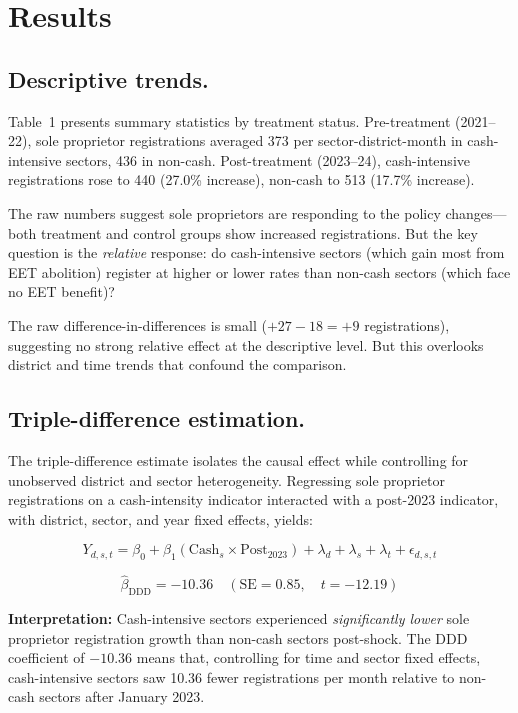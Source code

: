 \documentclass[12pt]{article}
\begin{document}
\section{Results}

\subsection*{Descriptive trends.}
Table~1 presents summary statistics by treatment status. Pre-treatment (2021--22), sole proprietor registrations averaged 373 per sector-district-month in cash-intensive sectors, 436 in non-cash. Post-treatment (2023--24), cash-intensive registrations rose to 440 (27.0\% increase), non-cash to 513 (17.7\% increase).

The raw numbers suggest sole proprietors are responding to the policy changes—both treatment and control groups show increased registrations. But the key question is the \emph{relative} response: do cash-intensive sectors (which gain most from EET abolition) register at higher or lower rates than non-cash sectors (which face no EET benefit)?

The raw difference-in-differences is small ($+27 - 18 = +9$ registrations), suggesting no strong relative effect at the descriptive level. But this overlooks district and time trends that confound the comparison.

\subsection*{Triple-difference estimation.}
The triple-difference estimate isolates the causal effect while controlling for unobserved district and sector heterogeneity. Regressing sole proprietor registrations on a cash-intensity indicator interacted with a post-2023 indicator, with district, sector, and year fixed effects, yields:

$$Y_{d,s,t} = \beta_0 + \beta_1 (\text{Cash}_s \times \text{Post}_{2023}) + \lambda_d + \lambda_s + \lambda_t + \epsilon_{d,s,t}$$

$$\hat{\beta}_{\text{DDD}} = -10.36 \quad (\text{SE} = 0.85, \quad t = -12.19)$$

\textbf{Interpretation:} Cash-intensive sectors experienced \emph{significantly lower} sole proprietor registration growth than non-cash sectors post-shock. The DDD coefficient of $-10.36$ means that, controlling for time and sector fixed effects, cash-intensive sectors saw 10.36 fewer registrations per month relative to non-cash sectors after January 2023.
\end{document}
